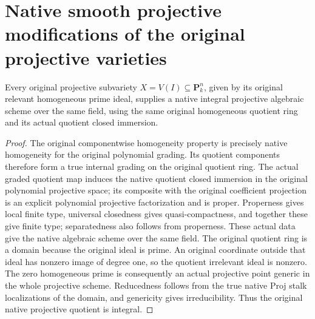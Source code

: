 \section{Native smooth projective modifications of the original projective varieties}

\begin{lemma}
\label{lem:fc-original-projective-variety-native-scheme}
\leanok
{}
Every original projective subvariety $X=V(I)\subseteq\mathbf P^n_k$, given by
its original relevant homogeneous prime ideal, supplies a native integral
projective algebraic scheme over the same field, using the same original
homogeneous quotient ring and its actual quotient closed immersion.
\end{lemma}
\begin{proof}
The original componentwise homogeneity property is precisely native homogeneity
for the original polynomial grading.  Its quotient components therefore form
a true internal grading on the original quotient ring.  The actual graded
quotient map induces the native quotient closed immersion in the original
polynomial projective space; its composite with the original coefficient
projection is an explicit polynomial projective factorization and is proper.
Properness gives local finite type, universal closedness gives quasi-compactness,
and together these give finite type; separatedness also follows from properness.
These actual data give the native algebraic scheme over the same field.
The original quotient ring is a domain because the original ideal is prime.
An original coordinate outside that ideal has nonzero image of degree one,
so the quotient irrelevant ideal is nonzero.  The zero homogeneous prime
is consequently an actual projective point generic in the whole projective
scheme.  Reducedness follows from the true native Proj stalk localizations
of the domain, and genericity gives irreducibility.  Thus the original native
projective quotient is integral.
\end{proof}

